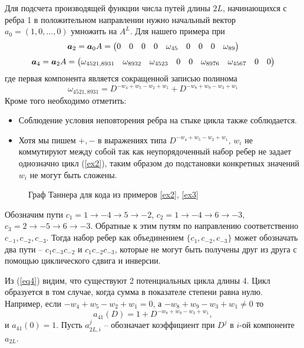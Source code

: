 Для подсчета производящей функции числа путей длины $2L$, начинающихся с ребра 1 в положительном направлении
нужно начальный вектор $a_0=(1,0,...,0)$ умножить на $A^L$. Для нашего примера при
 \begin{equation}
\boldsymbol{a}_2=\boldsymbol{a}_0 A =
\begin{pmatrix}
     0    & 0 &    0 &    0 &    \omega_{45}   &  0 &    0 &    0 &    \omega_{89}
 \end{pmatrix}
\end{equation} 
\begin{equation}\label{eq4}
 \boldsymbol{a}_4=\boldsymbol{a}_2A=
 \begin{pmatrix}    
    \omega_{4521,8931}  &\omega_{8932} & \omega_{4523 } &0 &    0 &    \omega_{8976}   & \omega_{4567 }&    0 &    0 
 \end{pmatrix}
\end{equation} 
где первая компонента является сокращенной записью полинома
\[
 \omega_{4521,8931}=D^{-w_4+w_5-w_2+w_1}+D^{-w_8+w_9-w_3+w_1}
\]
Кроме того необходимо отметить:
\begin{itemize}
\item 
Соблюдение условия неповторения ребра на стыке цикла также соблюдается.
\item
Хотя мы пишем $+, -$  в выражениях типа $D^{-w_4+w_5-w_2+w_1}$,
$w_i$ не коммутируют между собой так как неупорядоченный набор ребер не задает однозначно цикл (\ref{ex2}),
 таким образом до подстановки конкретных значений $w_i$ не могут быть сложены.
\end{itemize}

\begin{figure}[!h]
  \centering
   \caption{Граф Таннера для кода из примеров \ref{ex2}, \ref{ex3}}
  \label{fig1}
\end{figure}

\begin{example} \label{ex2}
  Обозначим пути $c_1=1 \to -4 \to 5 \to -2$, $c_2=1 \to -4 \to 6 \to -3$, $c_3=2 \to -5 \to 6 \to -3$.
 Обратные к этим путям по направлению соответственно $c_{-1}, c_{-2}, c_{-3}$.
 Тогда набор ребер как объединением $\{c_1,c_{-2},c_{-3}\}$ может обозначать два пути -- $c_1c_{-3}c_{-2}$ и 
$c_1c_{-2}c_{-3}$, которые не могут быть получены друг из друга с помощью циклического сдвига и инверсии.
\end{example}

Из (\ref{eq4}) видим, что существуют 2 потенциальных цикла длины 4. 
Цикл образуется в том случае, когда сумма в показателе степени равна нулю. 
Например, если $-w_4+w_5-w_2+w_1=0$, а  $-w_8+w_9-w_3+w_1\neq 0$  то 
\[
a_{41}(D)=1+D^{-w_8+w_9-w_3+w_1}, 
\]
и $a_{41}(0)=1$.
Пусть $a_{2L,i}^{j}$ -- обозначает коэффициент при $D^j$ в $i$-ой компоненте $a_{2L}$.

